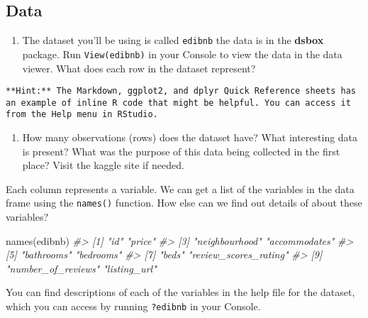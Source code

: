 \documentclass[
]{book}
\newenvironment{Shaded}{\begin{snugshade}}{\end{snugshade}}
\newcommand{\CommentTok}[1]{\textcolor[rgb]{0.56,0.35,0.01}{\textit{#1}}}
\newcommand{\FunctionTok}[1]{\textcolor[rgb]{0.00,0.00,0.00}{#1}}
\newcommand{\NormalTok}[1]{#1}
\providecommand{\tightlist}{%
  \setlength{\itemsep}{0pt}\setlength{\parskip}{0pt}}
\begin{document}
\hypertarget{data}{%
\subsection{Data}\label{data}}

\begin{enumerate}
\def\labelenumi{\arabic{enumi}.}
\setcounter{enumi}{1}
\tightlist
\item
  The dataset you'll be using is called \texttt{edibnb} the data is in the \textbf{dsbox} package. Run \texttt{View(edibnb)} in your Console to view the data in the data viewer. What does each row in the dataset represent?
\end{enumerate}

\begin{verbatim}
**Hint:** The Markdown, ggplot2, and dplyr Quick Reference sheets has an example of inline R code that might be helpful. You can access it from the Help menu in RStudio.
\end{verbatim}

\begin{enumerate}
\def\labelenumi{\arabic{enumi}.}
\setcounter{enumi}{2}
\tightlist
\item
  How many observations (rows) does the dataset have? What interesting data is present? What was the purpose of this data being collected in the first place? Visit the kaggle site if needed.
\end{enumerate}

Each column represents a variable. We can get a list of the variables in the data frame using the \texttt{names()} function. How else can we find out details of about these variables?

\begin{Shaded}
\begin{Highlighting}[]
\FunctionTok{names}\NormalTok{(edibnb)}
\CommentTok{\#\textgreater{}  [1] "id"                   "price"               }
\CommentTok{\#\textgreater{}  [3] "neighbourhood"        "accommodates"        }
\CommentTok{\#\textgreater{}  [5] "bathrooms"            "bedrooms"            }
\CommentTok{\#\textgreater{}  [7] "beds"                 "review\_scores\_rating"}
\CommentTok{\#\textgreater{}  [9] "number\_of\_reviews"    "listing\_url"}
\end{Highlighting}
\end{Shaded}

You can find descriptions of each of the variables in the help file for the dataset, which you can access by running \texttt{?edibnb} in your Console.
\end{document}
